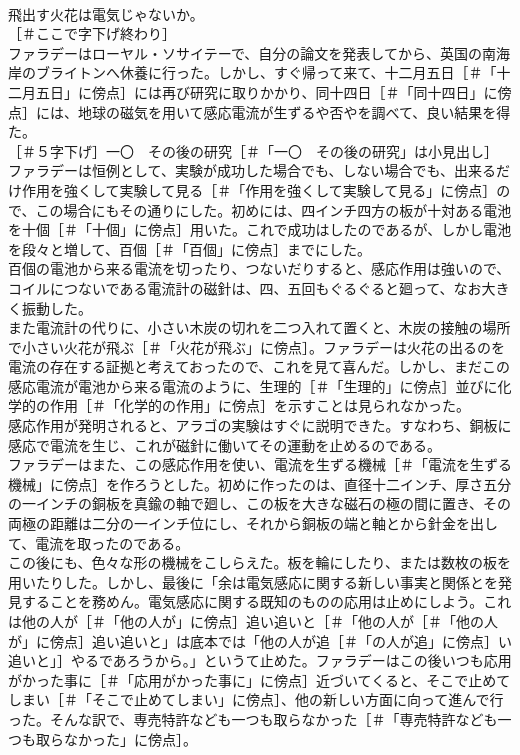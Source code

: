 \documentclass[8pt]{extreport}
\begin{document}
\begin{CJK}{UTF8}{min}
\\	飛出す火花は電気じゃないか。
\\	［＃ここで字下げ終わり］
\\	ファラデーはローヤル・ソサイテーで、自分の論文を発表してから、英国の南海岸のブライトンへ休養に行った。しかし、すぐ帰って来て、十二月五日［＃「十二月五日」に傍点］には再び研究に取りかかり、同十四日［＃「同十四日」に傍点］には、地球の磁気を用いて感応電流が生ずるや否やを調べて、良い結果を得た。
\\	［＃５字下げ］一〇　その後の研究［＃「一〇　その後の研究」は小見出し］
\\	ファラデーは恒例として、実験が成功した場合でも、しない場合でも、出来るだけ作用を強くして実験して見る［＃「作用を強くして実験して見る」に傍点］ので、この場合にもその通りにした。初めには、四インチ四方の板が十対ある電池を十個［＃「十個」に傍点］用いた。これで成功はしたのであるが、しかし電池を段々と増して、百個［＃「百個」に傍点］までにした。
\\	百個の電池から来る電流を切ったり、つないだりすると、感応作用は強いので、コイルにつないである電流計の磁針は、四、五回もぐるぐると廻って、なお大きく振動した。
\\	また電流計の代りに、小さい木炭の切れを二つ入れて置くと、木炭の接触の場所で小さい火花が飛ぶ［＃「火花が飛ぶ」に傍点］。ファラデーは火花の出るのを電流の存在する証拠と考えておったので、これを見て喜んだ。しかし、まだこの感応電流が電池から来る電流のように、生理的［＃「生理的」に傍点］並びに化学的の作用［＃「化学的の作用」に傍点］を示すことは見られなかった。
\\	感応作用が発明されると、アラゴの実験はすぐに説明できた。すなわち、銅板に感応で電流を生じ、これが磁針に働いてその運動を止めるのである。
\\	ファラデーはまた、この感応作用を使い、電流を生ずる機械［＃「電流を生ずる機械」に傍点］を作ろうとした。初めに作ったのは、直径十二インチ、厚さ五分の一インチの銅板を真鍮の軸で廻し、この板を大きな磁石の極の間に置き、その両極の距離は二分の一インチ位にし、それから銅板の端と軸とから針金を出して、電流を取ったのである。
\\	この後にも、色々な形の機械をこしらえた。板を輪にしたり、または数枚の板を用いたりした。しかし、最後に「余は電気感応に関する新しい事実と関係とを発見することを務めん。電気感応に関する既知のものの応用は止めにしよう。これは他の人が［＃「他の人が」に傍点］追い追いと［＃「他の人が［＃「他の人が」に傍点］追い追いと」は底本では「他の人が追［＃「の人が追」に傍点］い追いと」］やるであろうから。」というて止めた。ファラデーはこの後いつも応用がかった事に［＃「応用がかった事に」に傍点］近づいてくると、そこで止めてしまい［＃「そこで止めてしまい」に傍点］、他の新しい方面に向って進んで行った。そんな訳で、専売特許なども一つも取らなかった［＃「専売特許なども一つも取らなかった」に傍点］。

\end{CJK}
\end{document}
